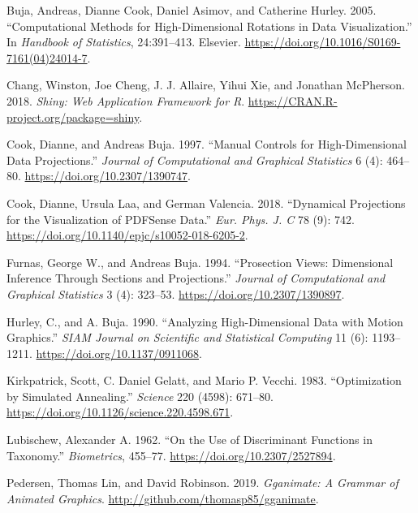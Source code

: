 \leavevmode\hypertarget{ref-buja_computational_2005}{}%
Buja, Andreas, Dianne Cook, Daniel Asimov, and Catherine Hurley. 2005.
``Computational Methods for High-Dimensional Rotations in Data
Visualization.'' In \emph{Handbook of Statistics}, 24:391--413.
Elsevier. \url{https://doi.org/10.1016/S0169-7161(04)24014-7}.

\leavevmode\hypertarget{ref-chang_shiny:_2018}{}%
Chang, Winston, Joe Cheng, J. J. Allaire, Yihui Xie, and Jonathan
McPherson. 2018. \emph{Shiny: Web Application Framework for R}.
\url{https://CRAN.R-project.org/package=shiny}.

\leavevmode\hypertarget{ref-cook_manual_1997}{}%
Cook, Dianne, and Andreas Buja. 1997. ``Manual Controls for
High-Dimensional Data Projections.'' \emph{Journal of Computational and
Graphical Statistics} 6 (4): 464--80.
\url{https://doi.org/10.2307/1390747}.

\leavevmode\hypertarget{ref-cook_dynamical_2018}{}%
Cook, Dianne, Ursula Laa, and German Valencia. 2018. ``Dynamical
Projections for the Visualization of PDFSense Data.'' \emph{Eur. Phys.
J. C} 78 (9): 742. \url{https://doi.org/10.1140/epjc/s10052-018-6205-2}.

\leavevmode\hypertarget{ref-furnas_prosection_1994}{}%
Furnas, George W., and Andreas Buja. 1994. ``Prosection Views:
Dimensional Inference Through Sections and Projections.'' \emph{Journal
of Computational and Graphical Statistics} 3 (4): 323--53.
\url{https://doi.org/10.2307/1390897}.

\leavevmode\hypertarget{ref-hurley_analyzing_1990}{}%
Hurley, C., and A. Buja. 1990. ``Analyzing High-Dimensional Data with
Motion Graphics.'' \emph{SIAM Journal on Scientific and Statistical
Computing} 11 (6): 1193--1211. \url{https://doi.org/10.1137/0911068}.

\leavevmode\hypertarget{ref-kirkpatrick_optimization_1983}{}%
Kirkpatrick, Scott, C. Daniel Gelatt, and Mario P. Vecchi. 1983.
``Optimization by Simulated Annealing.'' \emph{Science} 220 (4598):
671--80. \url{https://doi.org/10.1126/science.220.4598.671}.

\leavevmode\hypertarget{ref-lubischew_use_1962}{}%
Lubischew, Alexander A. 1962. ``On the Use of Discriminant Functions in
Taxonomy.'' \emph{Biometrics}, 455--77.
\url{https://doi.org/10.2307/2527894}.

\leavevmode\hypertarget{ref-pedersen_gganimate:_2019}{}%
Pedersen, Thomas Lin, and David Robinson. 2019. \emph{Gganimate: A
Grammar of Animated Graphics}.
\url{http://github.com/thomasp85/gganimate}.

